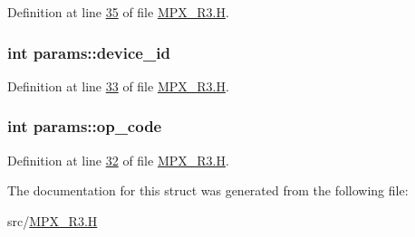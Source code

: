 Definition at line \hyperlink{_m_p_x___r3_8_h_source_l00035}{35} of file \hyperlink{_m_p_x___r3_8_h_source}{MPX\_\-R3.H}.

\hypertarget{structparams_a85b8d139fb9b97b59b21b4fca0afcf07}{
\subsubsection[{device\_\-id}]{\setlength{\rightskip}{0pt plus 5cm}int {\bf params::device\_\-id}}}
\label{structparams_a85b8d139fb9b97b59b21b4fca0afcf07}


Definition at line \hyperlink{_m_p_x___r3_8_h_source_l00033}{33} of file \hyperlink{_m_p_x___r3_8_h_source}{MPX\_\-R3.H}.

\hypertarget{structparams_a6241c070629ecc889aeaebd1665d2950}{
\subsubsection[{op\_\-code}]{\setlength{\rightskip}{0pt plus 5cm}int {\bf params::op\_\-code}}}
\label{structparams_a6241c070629ecc889aeaebd1665d2950}


Definition at line \hyperlink{_m_p_x___r3_8_h_source_l00032}{32} of file \hyperlink{_m_p_x___r3_8_h_source}{MPX\_\-R3.H}.



The documentation for this struct was generated from the following file:\begin{DoxyCompactItemize}
\item 
src/\hyperlink{_m_p_x___r3_8_h}{MPX\_\-R3.H}\end{DoxyCompactItemize}
